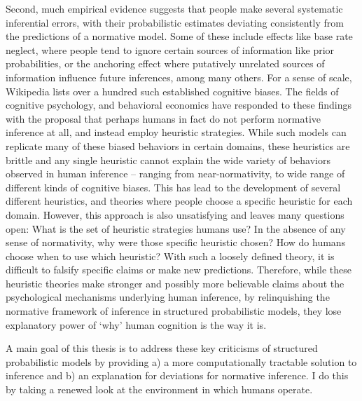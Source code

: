 Second, much empirical evidence suggests that people make several systematic inferential errors, with their probabilistic estimates deviating consistently from the predictions of a normative model. Some of these include effects like base rate neglect, where people tend to ignore certain sources of information like prior probabilities, or the anchoring effect where putatively unrelated sources of information influence future inferences, among many others. For a sense of scale, Wikipedia lists over a hundred such established cognitive biases. The fields of cognitive psychology\citep{phillips1966conservatism, gigerenzer1996reasoning}, and behavioral economics\citep{kahneman1973psychology} have responded to these findings with the proposal that perhaps humans in fact do not perform normative inference at all, and instead employ heuristic strategies. While such models can replicate many of these biased behaviors in certain domains, these heuristics are brittle and any single heuristic cannot explain the wide variety of behaviors observed in human inference -- ranging from near-normativity, to wide range of different kinds of cognitive biases. This has lead to the development of several different heuristics, and theories where people choose a specific heuristic for each domain. However, this approach is also unsatisfying and leaves many questions open: What is the set of heuristic strategies humans use? In the absence of any sense of normativity, why were those specific heuristic chosen? How do humans choose when to use which heuristic? With such a loosely defined theory, it is difficult to falsify specific claims or make new predictions. Therefore, while these heuristic theories make stronger and possibly more believable claims about the psychological mechanisms underlying human inference, by relinquishing the normative framework of inference in structured probabilistic models, they lose explanatory power of `why' human cognition is the way it is.

A main goal of this thesis is to address these key criticisms of structured probabilistic models by providing a) a more computationally tractable solution to inference and b) an explanation for deviations for normative inference. I do this by taking a renewed look at the environment in which humans operate.


